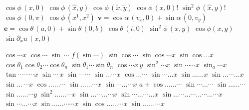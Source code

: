 \documentclass{article}
\begin{document}
$\cos\phi\,(x,0)$ $\cos\phi\,(\hat x,y)$ $\cos\phi\,(\tilde x,\tilde y)$ $\cos\phi\,(x,0)!$ $\sin^2\phi\,(\hat x,y)!$ $\cos\phi\,(0,\pi)$
$\cos\phi\,(x^1,x^2)$ $\mathbf v=\cos\alpha\,(v_x,0)+\sin\alpha\,(0,v_y)$ $\mathbf e=\cos\theta\,(a,0)+\sin\theta\,(0,b)$
$\cos\theta\,(i,0)$ $\sin^2\phi\,(x,y)$ $\cos\phi(x,y)$ $\sin\partial_x u\,(x,0)$

$\cos\cdots x$ $\cos\cdots$ $\sin\,\cdots$ $f(\sin\cdots)$ $\sin\cos\cdots$ $\sin\cos\cdots x$ $\sin\cos\ldots x$
$\cos\theta_1\cos\theta_2\cdots\cos\theta_n$ $\sin\theta_1\cdots\sin\theta_n$
$\cos\cdots x\,y$ $\sin^2\cdots x$ $\sin\cdots\cdots x$ $\sin_a\cdots x$ $\tan\cdots\cdots\cdots x$ $\sin\cdots\,x$ $\sin\cdots\,\cdots$
$\sin\ldots\cdots x$ $\cos\ldots\cdots$ $\sin\cdots\ldots x$ $\sin\ldots\ldots x$ $\sin\dots\cdots\ldots x$ $\sin\ldots\,\cdots x$
$\cos\ldots\ldots\cdots$ $\sin\ldots\ldots\cdots x$ $\sin\cdots\ldots\cdots x$ $a+\cos\ldots\ldots\cdots$ $\sin\cdots\ldots\cdots$
$\sin\ldots\ldots\cdots$ $\sin\dots\dots\cdots y$ $\sin^2\ldots\ldots\cdots x$ $\sin\dots\cdots\ldots\cdots x$ $\sin\cdots\ldots\cdots\ldots x$
$\sin\ldots\cdots\ldots\cdots\ldots\cdots\ldots\cdots x$ $\sin\dotsb\dotsc\cdots x$ $\sin\ldots\ldots\cdots\cdots x$ $\sin\cos\ldots\ldots\cdots x$
$\sin\ldots\ldots\,\cdots x$
\end{document}
